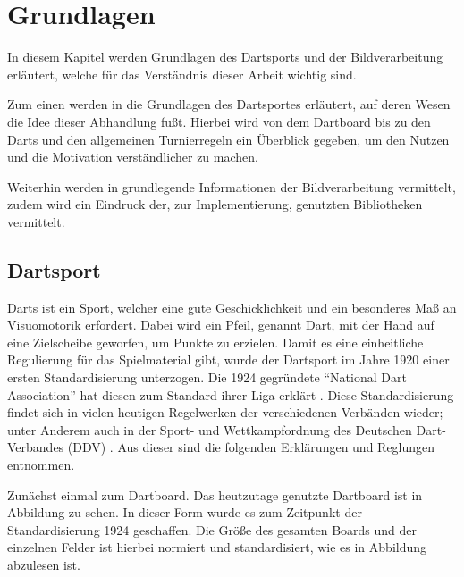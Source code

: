
\chapter{Grundlagen}
\label{chap:fundamentals}
In diesem Kapitel werden Grundlagen des Dartsports und der Bildverarbeitung erläutert, welche für das Verständnis dieser Arbeit wichtig sind. 

Zum einen werden in  die Grundlagen des Dartsportes erläutert, auf deren Wesen die Idee dieser Abhandlung fußt. Hierbei wird von dem Dartboard bis zu den Darts und den allgemeinen Turnierregeln ein Überblick gegeben, um den Nutzen und die Motivation verständlicher zu machen.

Weiterhin werden in  grundlegende Informationen der Bildverarbeitung vermittelt, zudem wird ein Eindruck der, zur Implementierung, genutzten Bibliotheken vermittelt.

\section{Dartsport}
\label{sec:darts}
Darts ist ein Sport, welcher eine gute Geschicklichkeit und ein besonderes Maß an Visuomotorik erfordert. Dabei wird ein Pfeil, genannt Dart, mit der Hand auf eine Zielscheibe geworfen, um Punkte zu erzielen. Damit es eine einheitliche Regulierung für das Spielmaterial gibt, wurde der Dartsport im Jahre 1920 einer ersten Standardisierung unterzogen. Die 1924 gegründete "`National Dart Association"' hat diesen zum Standard ihrer Liga erklärt \autocite[5]{guide2013}. Diese Standardisierung findet sich in vielen heutigen Regelwerken der verschiedenen Verbänden wieder; unter Anderem auch in der Sport- und Wettkampfordnung des Deutschen
Dart-Verbandes (DDV) \autocite{DartsRegel2016}. Aus dieser sind die folgenden Erklärungen und Reglungen entnommen. 

Zunächst einmal zum Dartboard. Das heutzutage genutzte Dartboard ist in Abbildung  zu sehen. In dieser Form wurde es zum Zeitpunkt der Standardisierung 1924 geschaffen. Die Größe des gesamten Boards und der einzelnen Felder ist hierbei normiert und standardisiert, wie es in Abbildung  abzulesen ist. 


